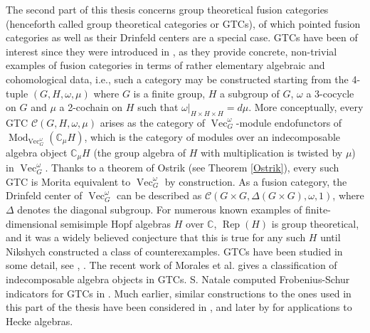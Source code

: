 \documentclass[a4paper, 10pt]{book}
\theoremstyle{definition}
\numberwithin{equation}{chapter}
\newcommand\Rep{\operatorname{Rep}}
\newcommand\Vect{\operatorname{Vec}}
\newcommand\Mod{\operatorname{Mod}}
\newcommand\CC{\mathbb C}
\newcommand\kk{\mathbb C}
\newcommand\C{\mathcal C}
\begin{document}
The second part of this thesis concerns group theoretical fusion categories (henceforth called group theoretical categories or GTCs), of which pointed fusion categories as well as their Drinfeld centers are a special case. GTCs  have been of interest since they were introduced in \cite{Ost:MCDDFG}, as they provide concrete, non-trivial examples of fusion categories in terms of rather elementary algebraic and cohomological data, i.e., such a category may be constructed starting from the 4-tuple $(G, H, \omega, \mu)$ where $G$ is a finite group, $H$ a subgroup of $G$, $\omega$ a 3-cocycle on $G$ and $\mu$ a 2-cochain on $H$ such that $\omega|_{H\times H\times H} = d\mu$. More conceptually, every GTC $\C(G, H, \omega, \mu)$ arises as the category of $\Vect^\omega_G$-module endofunctors of $\Mod_{\Vect^\omega_G}(\kk_\mu H)$, which is the category of modules over an indecomposable algebra object $\CC_\mu H$ (the group algebra of $H$ with multiplication is twisted by $\mu$) in $\Vect^\omega_G$. Thanks to a theorem of Ostrik (see Theorem \ref{Ostrik}), every such GTC is Morita equivalent to $\Vect^\omega_G$ by construction. As a fusion category, the Drinfeld center of $\Vect^\omega_G$ can be described as $\C(G\times G, \Delta(G\times G), \omega, 1)$, where $\Delta$ denotes the diagonal subgroup. For numerous known examples of finite-dimensional semisimple Hopf algebras $H$ over $\CC$, $\Rep(H)$ is group theoretical, and it was a widely believed conjecture that this is true for any such $H$ until Nikshych \cite{MR2480712} constructed a class of counterexamples. GTCs have been studied in some detail, see \cite{MR2710113}, \cite{MR2559854}. The recent work of Morales et al. \cite{2020arXiv200103837M} gives a classification of indecomposable algebra objects in GTCs. S. Natale computed Frobenius-Schur indicators for GTCs in \cite{Nat:FSICFC}. Much earlier, similar constructions to the ones used in this part of the thesis have been considered in \cite{MR1887584}, and later by \cite{Zhu:HARRHA} for applications to Hecke algebras.\\
\end{document}
